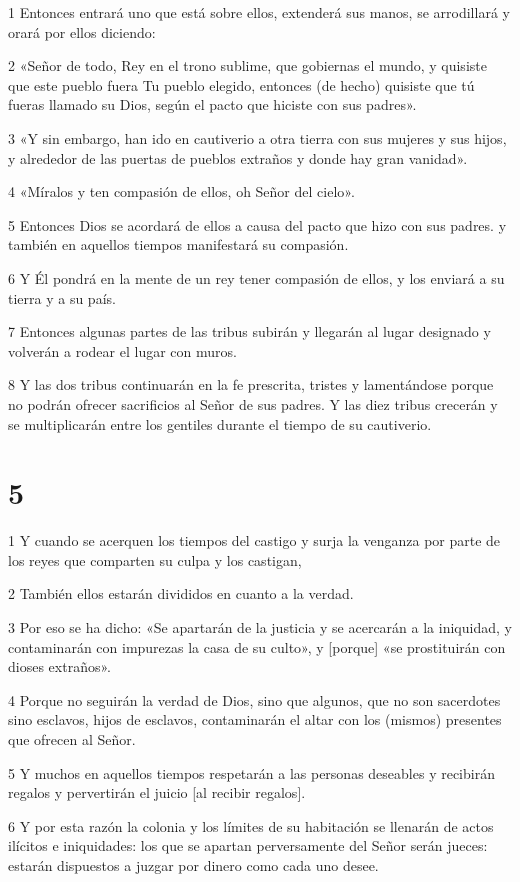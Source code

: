 \par 1 Entonces entrará uno que está sobre ellos, extenderá sus manos, se arrodillará y orará por ellos diciendo:
\par 2 «Señor de todo, Rey en el trono sublime, que gobiernas el mundo, y quisiste que este pueblo fuera Tu pueblo elegido, entonces (de hecho) quisiste que tú fueras llamado su Dios, según el pacto que hiciste con sus padres».
\par 3 «Y sin embargo, han ido en cautiverio a otra tierra con sus mujeres y sus hijos, y alrededor de las puertas de pueblos extraños y donde hay gran vanidad».
\par 4 «Míralos y ten compasión de ellos, oh Señor del cielo».
\par 5 Entonces Dios se acordará de ellos a causa del pacto que hizo con sus padres. y también en aquellos tiempos manifestará su compasión.
\par 6 Y Él pondrá en la mente de un rey tener compasión de ellos, y los enviará a su tierra y a su país.
\par 7 Entonces algunas partes de las tribus subirán y llegarán al lugar designado y volverán a rodear el lugar con muros.
\par 8 Y las dos tribus continuarán en la fe prescrita, tristes y lamentándose porque no podrán ofrecer sacrificios al Señor de sus padres. Y las diez tribus crecerán y se multiplicarán entre los gentiles durante el tiempo de su cautiverio.

\chapter{5}

\par 1 Y cuando se acerquen los tiempos del castigo y surja la venganza por parte de los reyes que comparten su culpa y los castigan,
\par 2 También ellos estarán divididos en cuanto a la verdad.
\par 3 Por eso se ha dicho: «Se apartarán de la justicia y se acercarán a la iniquidad, y contaminarán con impurezas la casa de su culto», y [porque] «se prostituirán con dioses extraños».
\par 4 Porque no seguirán la verdad de Dios, sino que algunos, que no son sacerdotes sino esclavos, hijos de esclavos, contaminarán el altar con los (mismos) presentes que ofrecen al Señor.
\par 5 Y muchos en aquellos tiempos respetarán a las personas deseables y recibirán regalos y pervertirán el juicio [al recibir regalos].
\par 6 Y por esta razón la colonia y los límites de su habitación se llenarán de actos ilícitos e iniquidades: los que se apartan perversamente del Señor serán jueces: estarán dispuestos a juzgar por dinero como cada uno desee.

